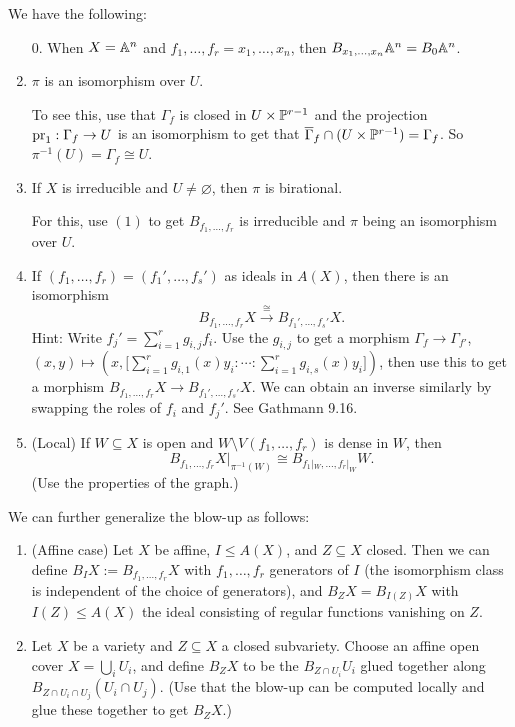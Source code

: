 \begin{remark}
  We have the following:
  \begin{enumerate}
    \item[0.] When $X = \mathbb{A}^n$ and
      $f_1, \dots, f_r = x_1, \dots, x_n$,
      then $B_{x_1, \dots, x_n} \mathbb{A}^n = B_0 \mathbb{A}^n$.
    \item $\pi$ is an isomorphism
      over $U$.

      To see this, use that
      $\Gamma_f$ is closed in
      $U \times \mathbb{P}^{r - 1}$ and
      the projection $\operatorname{pr}_1 : \Gamma_f \to U$
      is an isomorphism to get
      that $\overline{\Gamma}_f \cap (U \times \mathbb{P}^{r - 1}) = \Gamma_f$.
      So $\pi^{-1}(U) = \Gamma_f \cong U$.
    \item If $X$ is irreducible and
      $U \ne \varnothing$, then $\pi$ is birational.

      For this, use $(1)$ to get
      $B_{f_1, \dots, f_r}$ is irreducible
      and $\pi$ being an isomorphism
      over $U$.
    \item If $(f_1, \dots, f_r) = (f_1', \dots, f_s')$
      as ideals in $A(X)$, then there is
      an isomorphism
      \[
        B_{f_1, \dots, f_r} X
        \overset{\cong}{\longrightarrow}
        B_{f_1', \dots, f_s'} X.
      \]
      Hint: Write $f_j' = \sum_{i = 1}^r g_{i, j} f_i$.
      Use the $g_{i, j}$ to get a
      morphism $\Gamma_f \to \Gamma_{f'}$,
      $(x, y) \mapsto (x, \big[\sum_{i = 1}^r g_{i, 1}(x) y_i : \cdots : \sum_{i = 1}^r g_{i, s}(x) y_i\big])$,
      then use this to get a
      morphism $B_{f_1, \dots, f_r} X \to B_{f_1', \dots, f_s'} X$.
      We can obtain an inverse similarly
      by swapping
      the roles of $f_i$ and $f_j'$.
      See Gathmann 9.16.
    \item (Local) If $W \subseteq X$ is
      open and $W \setminus V(f_1, \dots, f_r)$
      is dense in $W$, then
      \[
        B_{f_1, \dots, f_r} X|_{\pi^{-1}(W)}
        \cong B_{f_1|_W, \dots, f_r|_W} W.
      \]
      (Use the properties of the graph.)
  \end{enumerate}
\end{remark}

\begin{remark}
  We can further generalize the blow-up
  as follows:
  \begin{enumerate}
    \item (Affine case) Let
      $X$ be affine, $I \le A(X)$, and
      $Z \subseteq X$ closed. Then we
      can define $B_I X := B_{f_1, \dots, f_r} X$
      with $f_1, \dots, f_r$ generators of
      $I$ (the isomorphism class is independent of the choice
      of generators), and
      $B_Z X = B_{I(Z)} X$
      with $I(Z) \le A(X)$ the ideal
      consisting of regular functions
      vanishing on $Z$.
    \item Let $X$ be a variety and $Z \subseteq X$ 
      a closed subvariety. Choose an affine
      open cover
      $X = \bigcup_i U_i$, and define
      $B_Z X$ to be the $B_{Z \cap U_i} U_i$
      glued together along
      $B_{Z \cap U_i \cap U_j} (U_i \cap U_j)$.
      (Use that the blow-up can be computed
      locally and glue these together to
      get $B_Z X$.)
  \end{enumerate}
\end{remark}
